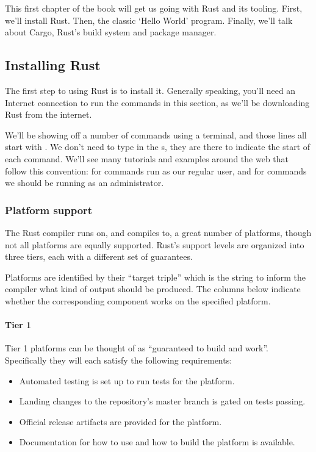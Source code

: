 This first chapter of the book will get us going with Rust and its tooling. First, we’ll install Rust. Then, the classic 
‘Hello World’ program. Finally, we’ll talk about Cargo, Rust’s build system and package manager.

\subsection{Installing Rust}

The first step to using Rust is to install it. Generally speaking, you’ll need an Internet connection to run the commands in 
this section, as we’ll be downloading Rust from the internet.

We’ll be showing off a number of commands using a terminal, and those lines all start with \code{\$}. We don't need to type in the 
\code{\$}s, they are there to indicate the start of each command. We’ll see many tutorials and examples around the web that follow 
this convention: \code{\$} for commands run as our regular user, and \code{\#} for commands we should be running as an administrator.

\subsubsection*{Platform support}

The Rust compiler runs on, and compiles to, a great number of platforms, though not all platforms are equally supported. 
Rust's support levels are organized into three tiers, each with a different set of guarantees.

Platforms are identified by their \enquote{target triple} which is the string to inform the compiler what kind of output should 
be produced. The columns below indicate whether the corresponding component works on the specified platform.

\paragraph*{Tier 1}

Tier 1 platforms can be thought of as \enquote{guaranteed to build and work}. Specifically they will each satisfy the 
following requirements:

\begin{itemize}
    \item{Automated testing is set up to run tests for the platform.}
    \item{Landing changes to the  repository's master branch is gated on tests passing.}
    \item{Official release artifacts are provided for the platform.}
    \item{Documentation for how to use and how to build the platform is available.}
\end{itemize}

